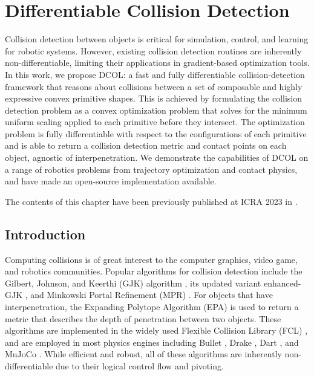 \graphicspath{{dcol/}}


\chapter{Differentiable Collision Detection}
\label{sec:dcol}

Collision detection between objects is critical for simulation, control, and learning for robotic systems. However, existing collision detection routines are inherently non-differentiable, limiting their applications in gradient-based optimization tools. In this work, we propose DCOL: a fast and fully differentiable collision-detection framework that reasons about collisions between a set of composable and highly expressive convex primitive shapes. This is achieved by formulating the collision detection problem as a convex optimization problem that solves for the minimum uniform scaling applied to each primitive before they intersect.  The optimization problem is fully differentiable with respect to the configurations of each primitive and is able to return a collision detection metric and contact points on each object, agnostic of interpenetration. We demonstrate the capabilities of DCOL on a range of robotics problems from trajectory optimization and contact physics, and have made an open-source implementation available.

The contents of this chapter have been previously published at ICRA 2023 in \citet{tracy2023b}.


\section{Introduction}
Computing collisions is of great interest to the computer graphics, video game, and robotics communities. Popular algorithms for collision detection include the Gilbert, Johnson, and Keerthi (GJK) algorithm \cite{gilbert1988}, its updated variant enhanced-GJK \cite{cameron1997}, and Minkowski Portal Refinement (MPR) \cite{snethen2008,newth2013}.  For objects that have interpenetration, the Expanding Polytope Algorithm (EPA) \cite{vandenbergen2001} is used to return a metric that describes the depth of penetration between two objects. These algorithms are implemented in the widely used Flexible Collision Library (FCL) \cite{pan2012}, and are employed in most physics engines including Bullet \cite{coumans2015}, Drake \cite{tedrake2019a}, Dart \cite{lee2018}, and MuJoCo \cite{todorov2012a}. While efficient and robust, all of these algorithms are inherently non-differentiable due to their logical control flow and pivoting.  

